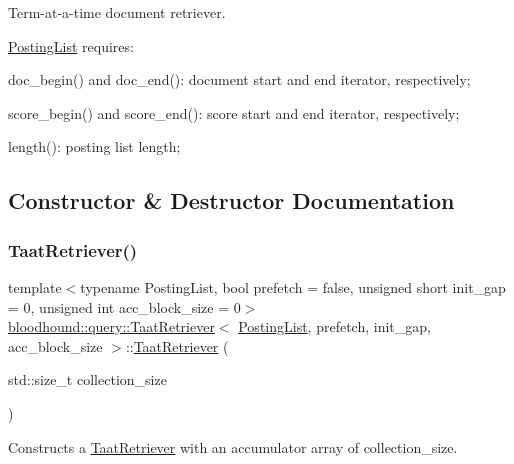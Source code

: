 Term-\/at-\/a-\/time document retriever.

\hyperlink{classbloodhound_1_1PostingList}{Posting\+List} requires\+:
\begin{DoxyItemize}
\item doc\+\_\+begin() and doc\+\_\+end()\+: document start and end iterator, respectively;
\item score\+\_\+begin() and score\+\_\+end()\+: score start and end iterator, respectively;
\item length()\+: posting list length; 
\end{DoxyItemize}

\subsection{Constructor \& Destructor Documentation}
\mbox{\label{classbloodhound_1_1query_1_1TaatRetriever_af443da08f4200fb84a3481d47bc4ac35}} 
\subsubsection{\texorpdfstring{Taat\+Retriever()}{TaatRetriever()}}
{\footnotesize\ttfamily template$<$typename Posting\+List, bool prefetch = false, unsigned short init\+\_\+gap = 0, unsigned int acc\+\_\+block\+\_\+size = 0$>$ \\
\hyperlink{classbloodhound_1_1query_1_1TaatRetriever}{bloodhound\+::query\+::\+Taat\+Retriever}$<$ \hyperlink{classbloodhound_1_1PostingList}{Posting\+List}, prefetch, init\+\_\+gap, acc\+\_\+block\+\_\+size $>$\+::\hyperlink{classbloodhound_1_1query_1_1TaatRetriever}{Taat\+Retriever} (\begin{DoxyParamCaption}\item[{std\+::size\+\_\+t}]{collection\+\_\+size }\end{DoxyParamCaption})\hspace{0.3cm}{\ttfamily [inline]}}



Constructs a \hyperlink{classbloodhound_1_1query_1_1TaatRetriever}{Taat\+Retriever} with an accumulator array of collection\+\_\+size. 



